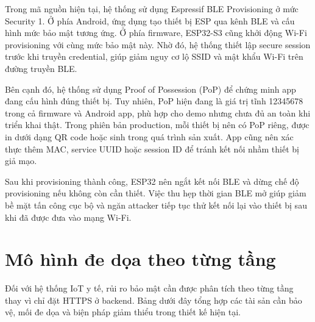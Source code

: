 \documentclass[a4paper,13pt,3p,oneside]{report}
\begin{document}
Trong mã nguồn hiện tại, hệ thống sử dụng Espressif BLE Provisioning ở mức Security 1. Ở phía Android, ứng dụng tạo thiết bị ESP qua kênh BLE và cấu hình mức bảo mật tương ứng. Ở phía firmware, ESP32-S3 cũng khởi động Wi-Fi provisioning với cùng mức bảo mật này. Nhờ đó, hệ thống thiết lập secure session trước khi truyền credential, giúp giảm nguy cơ lộ SSID và mật khẩu Wi-Fi trên đường truyền BLE.


Bên cạnh đó, hệ thống sử dụng Proof of Possession (PoP) để chứng minh app đang cấu hình đúng thiết bị. Tuy nhiên, PoP hiện đang là giá trị tĩnh 12345678 trong cả firmware và Android app, phù hợp cho demo nhưng chưa đủ an toàn khi triển khai thật. Trong phiên bản production, mỗi thiết bị nên có PoP riêng, được in dưới dạng QR code hoặc sinh trong quá trình sản xuất. App cũng nên xác thực thêm MAC, service UUID hoặc session ID để tránh kết nối nhầm thiết bị giả mạo.

Sau khi provisioning thành công, ESP32 nên ngắt kết nối BLE và dừng chế độ provisioning nếu không còn cần thiết. Việc thu hẹp thời gian BLE mở giúp giảm bề mặt tấn công cục bộ và ngăn attacker tiếp tục thử kết nối lại vào thiết bị sau khi đã được đưa vào mạng Wi-Fi.

\section{Mô hình đe dọa theo từng tầng}
Đối với hệ thống IoT y tế, rủi ro bảo mật cần được phân tích theo từng tầng thay vì chỉ đặt HTTPS ở backend. Bảng dưới đây tổng hợp các tài sản cần bảo vệ, mối đe dọa và biện pháp giảm thiểu trong thiết kế hiện tại.
\end{document}
